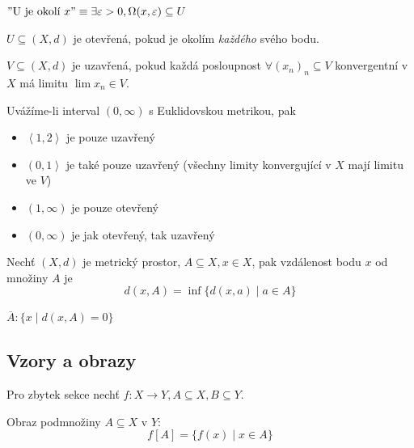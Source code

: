 \documentclass[../main.tex]{subfiles}
\begin{document}
\begin{example} 
	$"\textrm{U je okolí } x" \equiv \exists \varepsilon > 0, \Omega (x,\varepsilon) \subseteq U $
\end{example}

\begin{definition}
	$U \subseteq (X,d)$ je otevřená, pokud je okolím \textit{každého} svého bodu.
\end{definition}

\begin{definition}
	$V \subseteq (X,d)$ je uzavřená, pokud každá posloupnost $\forall (x_n)_n \subseteq V$ konvergentní v $X$ má limitu $\lim x_n \in V$.
\end{definition}

\begin{example}
	Uvážíme-li interval \(\left(0, \infty\right)\) s Euklidovskou metrikou, pak
\begin{itemize}
	\item \(\left<1, 2\right>\) je pouze uzavřený
	\item \(\left(0, 1\right>\) je také pouze uzavřený (všechny limity konvergující v \(X\) mají limitu ve \(V\))
	\item \(\left(1, \infty\right)\) je pouze otevřený
	\item \(\left(0, \infty\right)\) je jak otevřený, tak uzavřený
\end{itemize}
\end{example}

\begin{definition}
	Nechť $(X,d)$ je metrický prostor, $A \subseteq X, x\in X$, pak vzdálenost bodu $x$ od množiny $A$ je
	\[d(x,A) = \inf\{d(x,a)\mid a \in A\}\]
\end{definition}

\begin{definition}[Uzávěr]
	$\overline{A} : \{x \mid d(x,A) = 0\}$
\end{definition}

\subsection{Vzory a obrazy}
Pro zbytek sekce nechť $f: X \rightarrow Y, A \subseteq X, B \subseteq Y$.

\begin{definition}[Obraz]
	Obraz podmnožiny $A\subseteq X$ v $Y$:
	\[f[A] = \{f(x) \mid x \in A\}\]
\end{definition}
\end{document}
